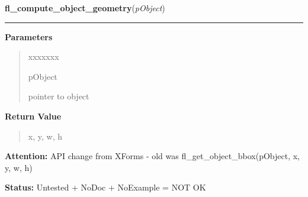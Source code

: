 \hspace{.8\funcindent}\begin{boxedminipage}{\funcwidth}

    \raggedright \textbf{fl\_compute\_object\_geometry}(\textit{pObject})

    \vspace{-1.5ex}

    \rule{\textwidth}{0.5\fboxrule}
\setlength{\parskip}{2ex}
\setlength{\parskip}{1ex}
      \textbf{Parameters}
      \vspace{-1ex}

      \begin{quote}
        \begin{Ventry}{xxxxxxx}

          \item[pObject]

          pointer to object

        \end{Ventry}

      \end{quote}

      \textbf{Return Value}
    \vspace{-1ex}

      \begin{quote}
      x, y, w, h

      \end{quote}

\textbf{Attention:} API change from XForms - old was fl\_get\_object\_bbox(pObject, x, y, w, h)



\textbf{Status:} Untested + NoDoc + NoExample = NOT OK



    \end{boxedminipage}

    \label{xformslib:library:fl_call_object_callback}

    \vspace{0.5ex}

